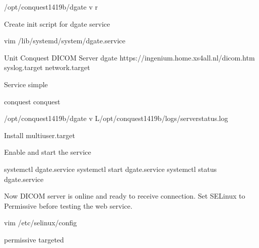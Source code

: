 \documentclass[letterpaper,10pt,english]{sphinxmanual}
\begin{document}
%
\begin{sphinxVerbatim}[commandchars=\\\{\}]
/opt/conquest\PYGZhy{}14\PYGZhy{}19b/dgate \PYGZhy{}v \PYGZhy{}r
\end{sphinxVerbatim}

Create init script for dgate service

%
\begin{sphinxVerbatim}[commandchars=\\\{\}]
vim /lib/systemd/system/dgate.service
\end{sphinxVerbatim}

%
\begin{sphinxVerbatim}[commandchars=\\\{\}]
\PYG{o}{[}Unit\PYG{o}{]}
Conquest DICOM Server dgate
https://ingenium.home.xs4all.nl/dicom.htm
syslog.target
network.target

\PYG{o}{[}Service\PYG{o}{]}
simple

conquest
conquest

/opt/conquest\PYGZhy{}14\PYGZhy{}19b/dgate \PYGZhy{}v \PYGZhy{}L/opt/conquest\PYGZhy{}14\PYGZhy{}19b/logs/serverstatus.log

\PYG{o}{[}Install\PYG{o}{]}
multi\PYGZhy{}user.target
\end{sphinxVerbatim}

Enable and start the service

%
\begin{sphinxVerbatim}[commandchars=\\\{\}]
systemctl  dgate.service
systemctl start dgate.service
systemctl status dgate.service
\end{sphinxVerbatim}

Now DICOM server is online and ready to receive connection. Set SELinux to Permissive before testing the web service.

%
\begin{sphinxVerbatim}[commandchars=\\\{\}]
vim /etc/selinux/config
\end{sphinxVerbatim}

%
\begin{sphinxVerbatim}[commandchars=\\\{\}]
permissive
targeted
\end{sphinxVerbatim}
\end{document}
